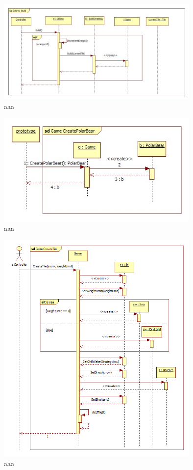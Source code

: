\begin{figure}[H]
        \begin{center}
                \includegraphics[width=10cm]{chapters/chapter07/seqdiag/Eskimo_Build.jpg}
                \caption{aaa}
                \label{bbb}
        \end{center}
\end{figure}
\begin{figure}[H]
        \begin{center}
                \includegraphics[width=10cm]{chapters/chapter07/seqdiag/Game_CreatePolarBear.jpg}
                \caption{aaa}
                \label{bbb}
        \end{center}
\end{figure}
\begin{figure}[H]
        \begin{center}
                \includegraphics[width=10cm]{chapters/chapter07/seqdiag/Game_CreateTile.png}
                \caption{aaa}
                \label{bbb}
        \end{center}
\end{figure}
